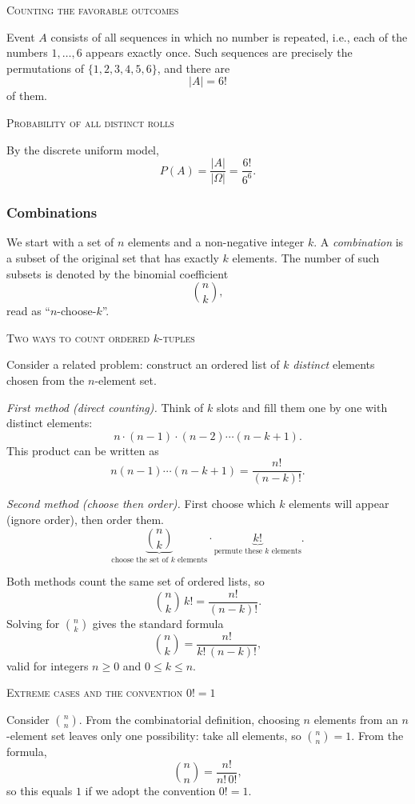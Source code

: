 \bigskip\textsc{Counting the favorable outcomes}

Event \(A\) consists of all sequences in which no number is repeated, i.e., each of the numbers \(1,\dots,6\) appears exactly once.  
Such sequences are precisely the permutations of \(\{1,2,3,4,5,6\}\), and there are
\[
|A| = 6!
\]
of them.

\bigskip\textsc{Probability of all distinct rolls}

By the discrete uniform model,
\[
P(A) = \frac{|A|}{|\Omega|} = \frac{6!}{6^6}.
\]

\subsubsection{Combinations}

We start with a set of \(n\) elements and a non-negative integer \(k\).  
A \textit{combination} is a subset of the original set that has exactly \(k\) elements.  
The number of such subsets is denoted by the binomial coefficient
\[
\binom{n}{k},
\]
read as “\(n\)-choose-\(k\)”.

\bigskip\textsc{Two ways to count ordered \(k\)-tuples}

Consider a related problem: construct an ordered list of \(k\) \textit{distinct} elements chosen from the \(n\)-element set.

\textit{First method (direct counting).}  
Think of \(k\) slots and fill them one by one with distinct elements:
\[
n \cdot (n-1) \cdot (n-2) \cdots (n-k+1).
\]
This product can be written as
\[
n (n-1) \cdots (n-k+1) = \frac{n!}{(n-k)!}.
\]

\textit{Second method (choose then order).}  
First choose which \(k\) elements will appear (ignore order), then order them.
\[
\underbrace{\binom{n}{k}}_{\text{choose the set of }k\text{ elements}}
\cdot
\underbrace{k!}_{\text{permute these }k\text{ elements}}.
\]

Both methods count the same set of ordered lists, so
\[
\binom{n}{k} \, k! = \frac{n!}{(n-k)!}.
\]
Solving for \(\binom{n}{k}\) gives the standard formula
\[
\binom{n}{k} = \frac{n!}{k! \, (n-k)!},
\]
valid for integers \(n \ge 0\) and \(0 \le k \le n\).

\newpage
\bigskip\textsc{Extreme cases and the convention \(0! = 1\)}

Consider \(\binom{n}{n}\).  
From the combinatorial definition, choosing \(n\) elements from an \(n\)-element set leaves only one possibility: take all elements, so \(\binom{n}{n} = 1\).  
From the formula,
\[
\binom{n}{n} = \frac{n!}{n! \, 0!},
\]
so this equals \(1\) if we adopt the convention \(0! = 1\).

